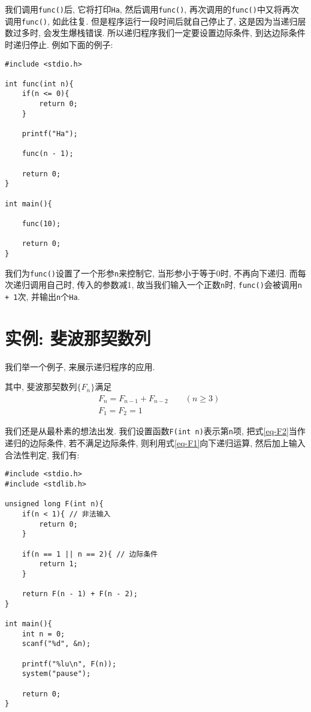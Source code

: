         我们调用\texttt{func()}后, 它将打印\texttt{Ha}, 然后调用\texttt{func()}, 再次调用的\texttt{func()}中又将再次调用\texttt{func()}, 如此往复. 但是程序运行一段时间后就自己停止了, 这是因为当递归层数过多时, 会发生爆栈错误. 所以递归程序我们一定要设置边际条件, 到达边际条件时递归停止. 例如下面的例子:
\begin{lstlisting}
#include <stdio.h>

int func(int n){
    if(n <= 0){
        return 0;
    }

    printf("Ha");

    func(n - 1);

    return 0;
}

int main(){

    func(10);

    return 0;
}
\end{lstlisting}

        我们为\texttt{func()}设置了一个形参\texttt{n}来控制它, 当形参小于等于0时, 不再向下递归. 而每次递归调用自己时, 传入的参数减1, 故当我们输入一个正数\texttt{n}时, \texttt{func()}会被调用\texttt{n + 1}次, 并输出\texttt{n}个\texttt{Ha}.

    \section{实例: 斐波那契数列}
        我们举一个例子, 来展示递归程序的应用.

        其中, 斐波那契数列$\{F_n\}$满足
        \begin{align}
            &F_n = F_{n-1} + F_{n-2} \qquad (n \geq 3) \tag{1} \label{eq-F1} \\
            &F_1 = F_2 = 1 \tag{2} \label{eq-F2}
        \end{align}

        我们还是从最朴素的想法出发. 我们设置函数\texttt{F(int n)}表示第\texttt{n}项, 把式\ref{eq-F2}当作递归的边际条件, 若不满足边际条件, 则利用式\ref{eq-F1}向下递归运算, 然后加上输入合法性判定, 我们有:
\begin{lstlisting}
#include <stdio.h>
#include <stdlib.h>

unsigned long F(int n){
    if(n < 1){ // 非法输入
        return 0;
    }

    if(n == 1 || n == 2){ // 边际条件
        return 1;
    }

    return F(n - 1) + F(n - 2);
}

int main(){
    int n = 0;
    scanf("%d", &n);

    printf("%lu\n", F(n));
    system("pause");

    return 0;
}
\end{lstlisting}

